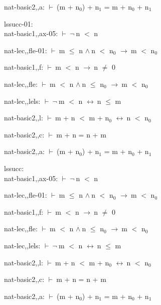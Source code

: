 \documentclass[a4paper]{article}
\newcommand{\Fol}{\mbox{$\vdash\ $}}
\newcommand{\Not}{\mbox{$\neg\ $}}
\newcommand{\And}{\mbox{$\wedge\ $}}
\newcommand{\Imp}{\mbox{$\rightarrow\ $}}
\newcommand{\Equiv}{\mbox{$\leftrightarrow\ $}}
\begin{document}
nat-basic2,,a: 
 \Fol (m + $\mbox{n}_{0}$) + $\mbox{n}_{1}$ = m + $\mbox{n}_{0}$ + $\mbox{n}_{1}$



\bigskip

lssucc-01:\\ nat-basic1,,ax-05: 
 \Fol \Not n $<$ n



nat-lec,,fle-01: 
 \Fol m $\le$ n \And n $<$ $\mbox{n}_{0}$ \Imp m $<$ $\mbox{n}_{0}$



nat-basic1,,f: 
 \Fol m $<$ n \Imp n $\neq$ 0



nat-lec,,fle: 
 \Fol m $<$ n \And n $\le$ $\mbox{n}_{0}$ \Imp m $<$ $\mbox{n}_{0}$



nat-lec,,lels: 
 \Fol \Not m $<$ n \Equiv n $\le$ m



nat-basic2,,l: 
 \Fol m + n $<$ m + $\mbox{n}_{0}$ \Equiv n $<$ $\mbox{n}_{0}$



nat-basic2,,c: 
 \Fol m + n = n + m



nat-basic2,,a: 
 \Fol (m + $\mbox{n}_{0}$) + $\mbox{n}_{1}$ = m + $\mbox{n}_{0}$ + $\mbox{n}_{1}$



\bigskip

lssucc:\\ nat-basic1,,ax-05: 
 \Fol \Not n $<$ n



nat-lec,,fle-01: 
 \Fol m $\le$ n \And n $<$ $\mbox{n}_{0}$ \Imp m $<$ $\mbox{n}_{0}$



nat-basic1,,f: 
 \Fol m $<$ n \Imp n $\neq$ 0



nat-lec,,fle: 
 \Fol m $<$ n \And n $\le$ $\mbox{n}_{0}$ \Imp m $<$ $\mbox{n}_{0}$



nat-lec,,lels: 
 \Fol \Not m $<$ n \Equiv n $\le$ m



nat-basic2,,l: 
 \Fol m + n $<$ m + $\mbox{n}_{0}$ \Equiv n $<$ $\mbox{n}_{0}$



nat-basic2,,c: 
 \Fol m + n = n + m



nat-basic2,,a: 
 \Fol (m + $\mbox{n}_{0}$) + $\mbox{n}_{1}$ = m + $\mbox{n}_{0}$ + $\mbox{n}_{1}$
\end{document}
